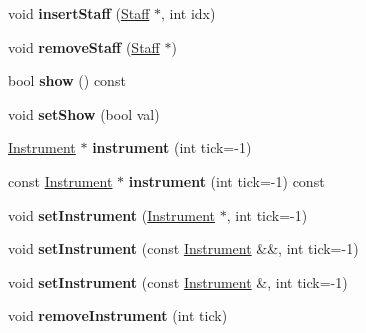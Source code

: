 \begin{DoxyCompactItemize}
void {\bfseries insert\+Staff} (\hyperlink{class_ms_1_1_staff}{Staff} $\ast$, int idx)
\item 
\mbox{\label{class_ms_1_1_part_a0c9bf8a8dafbf8abba9b39e45aba003e}} 
void {\bfseries remove\+Staff} (\hyperlink{class_ms_1_1_staff}{Staff} $\ast$)
\item 
\mbox{\label{class_ms_1_1_part_a184459de534501648fb8ca613cfdd1e4}} 
bool {\bfseries show} () const
\item 
\mbox{\label{class_ms_1_1_part_a781dda652f4144320f1a7e137ff507b7}} 
void {\bfseries set\+Show} (bool val)
\item 
\mbox{\label{class_ms_1_1_part_a18ae9fe09068a3ebaae9024971fc88a5}} 
\hyperlink{class_ms_1_1_instrument}{Instrument} $\ast$ {\bfseries instrument} (int tick=-\/1)
\item 
\mbox{\label{class_ms_1_1_part_a734e845f31160a583829c8b6babab848}} 
const \hyperlink{class_ms_1_1_instrument}{Instrument} $\ast$ {\bfseries instrument} (int tick=-\/1) const
\item 
\mbox{\label{class_ms_1_1_part_a96fb30e7559dc861a05147de06dc354d}} 
void {\bfseries set\+Instrument} (\hyperlink{class_ms_1_1_instrument}{Instrument} $\ast$, int tick=-\/1)
\item 
\mbox{\label{class_ms_1_1_part_ad67db0b930f13a6bd1726555c6c61800}} 
void {\bfseries set\+Instrument} (const \hyperlink{class_ms_1_1_instrument}{Instrument} \&\&, int tick=-\/1)
\item 
\mbox{\label{class_ms_1_1_part_a981714ea8766d9da250ec7bd2f24bfb4}} 
void {\bfseries set\+Instrument} (const \hyperlink{class_ms_1_1_instrument}{Instrument} \&, int tick=-\/1)
\item 
\mbox{\label{class_ms_1_1_part_a0d3388d9ecd3b7b74daec1cd05380641}} 
void {\bfseries remove\+Instrument} (int tick)
\item 
\mbox{\label{class_ms_1_1_part_a66a845c146281195bba2f88cf16fef82}} 

\end{DoxyCompactItemize}
